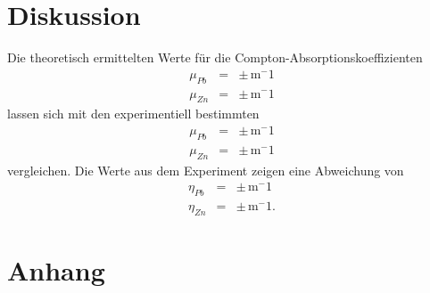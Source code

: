 \section{Diskussion}
\label{sec:Diskussion}


Die theoretisch ermittelten Werte für die Compton-Absorptionskoeffizienten
\begin{eqnarray}
  \mu_{Pb} &=&   \pm  \,  \mathrm{m^-1} \nonumber \\
  \mu_{Zn} &=&   \pm  \,  \mathrm{m^-1} \nonumber 
\end{eqnarray}
lassen sich mit den experimentiell bestimmten 
\begin{eqnarray}
  \mu_{Pb} &=&   \pm  \,  \mathrm{m^-1} \nonumber \\
  \mu_{Zn} &=&   \pm  \,  \mathrm{m^-1} \nonumber 
\end{eqnarray}
vergleichen. Die Werte aus dem Experiment zeigen eine Abweichung von
\begin{eqnarray}
  \eta_{Pb} &=&   \pm  \,  \mathrm{m^-1} \nonumber \\
  \eta_{Zn} &=&   \pm  \,  \mathrm{m^-1}. \nonumber 
\end{eqnarray}



\section{Anhang}
\label{sec:anhang}

